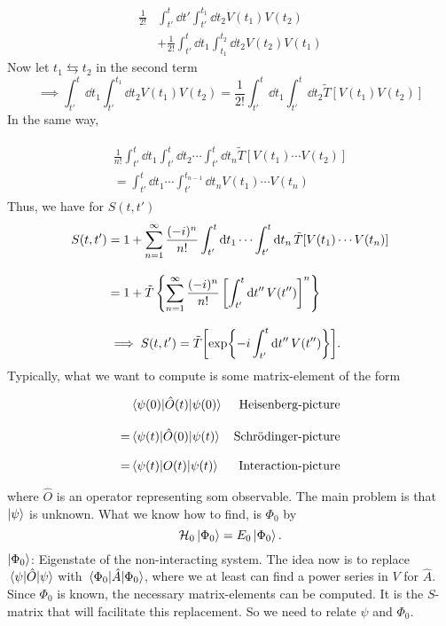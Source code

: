 \begin{align*} 
\frac{1}{2!}&\int_{t'}^{t}\dd{t'}\int_{t'}^{t_1}\dd{t_2}V(t_1)V(t_2)\\
&+\frac{1}{2!}\int_{t'}^{t}\dd{t_1}\int_{t_1}^{t_2}\dd{t_2}V(t_2)V(t_1)
\end{align*}
Now let $t_1 \leftrightarrows t_2$ in the second term
\begin{equation} 
\implies  \int_{t'}^{t}\dd{t_1}\int_{t'}^{t_1}\dd{t_2}V(t_1)V(t_2) = \frac{1}{2!}\int_{t'}^{t}\dd{t_1}\int_{t'}^{t}\dd{t_2}\tilde{T}[V(t_1)V(t_2)]
\end{equation}
In the same way, 

\begin{align}
\begin{split} 
\frac{1}{n!}\int_{t'}^{t}\dd{t_1}\int_{t'}^{t}\dd{t_2}\cdots \int_{t'}^{t}\dd{t_n}\tilde{T}[V(t_1)\cdots V(t_2)] \\[2ex]
=\int_{t'}^t\dd{t_1}\cdots\int_{t'}^{t_{n-1}}\dd{t_n}V(t_1)\cdots V(t_n)
\end{split}
\end{align}
Thus, we have for $S(t,t')$
\begin{align} 
\nonumber
S(t, t') &= 1 + \sum_{n=1}^{\infty}\frac{(-i)^n}{n!}\int_{t'}^{t}\dd{t_1}\cdots\int_{t'}^{t}\dd{t_n}\tilde{T}[V(t_1)\cdots V(t_n)] \\[2ex]
&= 1 + \tilde{T}\left\{\sum_{n=1}^{\infty}\frac{(-i)^n}{n!}\left[\int_{t'}^{t}\dd{t''}V(t'')\right]^n \right\}\nonumber \\[2ex]
&\implies S(t, t') = \tilde{T}\qty[\exp{\displaystyle -i\int_{t'}^{t}\dd{t''}V(t'')}].
\end{align}
Typically, what we want to compute is some matrix-element of the form 

\begin{align}
\nonumber
&\ev{\hat{O}(t)}{\psi(0)} & \text{Heisenberg-picture} \\[2ex] \label{eq:pictures}
= &\ev{\hat{O}(0)}{\psi(t)} & \text{Schrödinger-picture} \\[2ex]
= &\ev{O(t)}{\psi(t)} & \text{Interaction-picture}
\nonumber
\end{align}

where $\hat{O}$ is an operator representing som observable. The main problem is that $\ket{\psi}$ is unknown. What we know how to find, is $\Phi_0$ by
\begin{equation} 
\mathcal{H}_0\ket{\Phi_0} = E_0\ket{\Phi_0}.
\end{equation}
$\ket{\Phi_0}$: Eigenstate of the non-interacting system. The idea now is to replace $\ev{\hat{O}}{\psi}$ with $\ev{\hat A}{\Phi_0}$, where we at least can find a power series in $V$ for $\hat{A}$.  Since $\Phi_0$ is known, the necessary matrix-elements can be computed. It is the $S$-matrix that will facilitate this replacement. So we need to relate $\psi$ and $\Phi_0$. 

